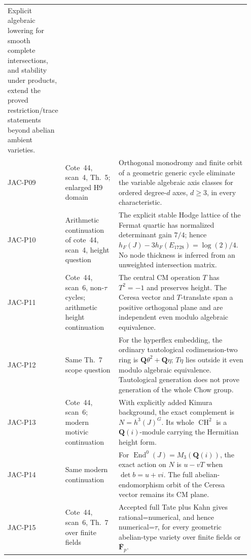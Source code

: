 \documentclass[11pt,a4paper]{article}
\begin{document}
\begin{longtable}{@{}p{0.12\linewidth}p{0.25\linewidth}p{0.58\linewidth}@{}}
Explicit algebraic lowering for smooth complete intersections,
and stability under products, extend the proved restriction/trace
statements beyond abelian ambient varieties.\\
JAC-P09 & Cote~44, scan~4, Th.~5; enlarged H9 domain &
Orthogonal monodromy and finite orbit of a geometric generic
cycle eliminate the variable algebraic axis classes for ordered
degree-$d$ axes, $d\ge3$, in every characteristic.\\
JAC-P10 & Arithmetic continuation of cote~44, scan~4, height question &
The explicit stable Hodge lattice of the Fermat quartic has
normalized determinant gain $7/4$; hence
$h_F(J)-3h_F(E_{1728})=\log(2)/4$. No node thickness is inferred
from an unweighted intersection matrix.\\
JAC-P11 & Cote~44, scan~6, non-$\tau$ cycles; arithmetic height continuation &
The central CM operation $T$ has $T^2=-1$ and preserves height.
The Ceresa vector and $T$-translate span a positive orthogonal
plane and are independent even modulo algebraic equivalence.\\
JAC-P12 & Same Th.~7 scope question &
For the hyperflex embedding, the ordinary tautological
codimension-two ring is $\mathbf Q\theta^2+\mathbf Q\eta$;
$T\eta$ lies outside it even modulo algebraic equivalence.
Tautological generation does not prove generation of the whole Chow group.\\
JAC-P13 & Cote~44, scan~6; modern motivic continuation &
With explicitly added Kimura background, the exact complement is
$N=h^3(J)^G$. Its whole $\operatorname{CH}^2$ is a
$\mathbf Q(i)$-module carrying the Hermitian height form.\\
JAC-P14 & Same modern continuation &
For $\operatorname{End}^0(J)=M_3(\mathbf Q(i))$, the exact action
on $N$ is $u-vT$ when $\det b=u+vi$. The full abelian-endomorphism
orbit of the Ceresa vector remains its CM plane.\\
JAC-P15 & Cote~44, scan~6, Th.~7 over finite fields &
Accepted full Tate plus Kahn gives rational=numerical, and hence
numerical=$\tau$, for every geometric abelian-type variety over
finite fields or $\overline{\mathbf F}_p$.\\
\bottomrule
\end{longtable}
\endgroup
\end{document}
